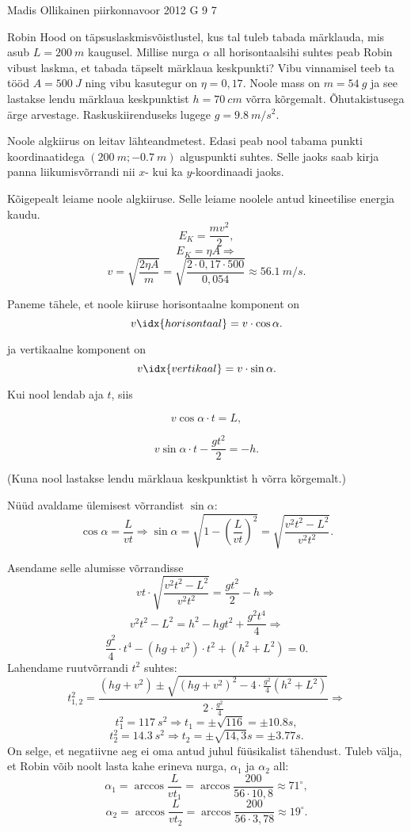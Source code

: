 {Madis Ollikainen} %
{piirkonnavoor} %
{2012} %
{G 9} %
{7} %
{
\ifStatement
Robin Hood on täpsuslaskmisvõistlustel, kus tal tuleb tabada märklauda, mis asub
$L=\SI{200}{m}$ kaugusel.  Millise nurga $\alpha$ all horisontaalsihi suhtes
peab Robin vibust laskma, et tabada täpselt märklaua keskpunkti? Vibu vinnamisel
teeb ta tööd $A=\SI{500}{J}$ ning vibu kasutegur on $\eta=0,17$. Noole mass on
$m=\SI{54}{g}$ ja see lastakse lendu märklaua keskpunktist $h=\SI{70}{cm}$ võrra
kõrgemalt.  Õhutakistusega ärge arvestage.  Raskuskiirenduseks lugege
$g=\SI{9,8}{m/s^2}$.
\fi


\ifHint
Noole algkiirus on leitav lähteandmetest. Edasi peab nool tabama punkti koordinaatidega $(\SI{200}{m};\SI{-0,7}{m})$ alguspunkti suhtes. Selle jaoks saab kirja panna liikumisvõrrandi nii $x$- kui ka $y$-koordinaadi jaoks.
\fi


\ifSolution
Kõigepealt leiame noole algkiiruse. Selle leiame noolele antud kineetilise energia kaudu.
$$ E_{K}=\frac{m v^2}{2},$$
$$E_{K}=\eta A \Rightarrow$$
$$v=\sqrt{\frac{2\eta A}{m}}=\sqrt{\frac{2\cdot0,17\cdot 500}{0,054}}\approx \SI{56,1}{m/s}.$$

Paneme tähele, et noole kiiruse horisontaalne komponent on
$$v\idx{horisontaal}=v\cdot \cos\alpha.$$

ja vertikaalne komponent on
$$v\idx{vertikaal}=v\cdot \sin\alpha.$$

Kui nool lendab aja $t$, siis 

$$v \cos\alpha\cdot t=L,$$

$$v \sin\alpha\cdot t-\frac{g t^2}{2}=-h. $$

(Kuna nool lastakse lendu märklaua keskpunktist h võrra kõrgemalt.)

Nüüd avaldame ülemisest võrrandist $\sin\alpha$:
$$\cos\alpha=\frac{L}{vt} \Rightarrow \sin\alpha=\sqrt{1-\left(\frac{L}{vt}\right)^2}=\sqrt{\frac{v^2t^2-L^2}{v^2t^2}}.$$


Asendame selle alumisse võrrandisse
$$vt\cdot \sqrt{\frac{v^2t^2-L^2}{v^2t^2}}=\frac{g t^2}{2}-h \Rightarrow$$
$$v^2t^2-L^2=h^2 - hgt^2+\frac{g^2 t^4}{4}  \Rightarrow$$
$$\frac{g^2}{4}\cdot t^4 - \left(hg+v^2\right)\cdot t^2 + \left(h^2+L^2\right)=0.$$
Lahendame ruutvõrrandi $t^2$ suhtes:
$$t^2_{1,2}=\frac{\left(hg+v^2\right)\pm\sqrt{\left(hg+v^2\right)^2-4\cdot \frac{g^2}{4}\left(h^2+L^2\right)}}{2\cdot \frac{g^2}{4}} \Rightarrow$$
$$t^2_{1}=\SI{117}{s^2}  \Rightarrow t_{1}=\pm\sqrt{116}=\pm \SI{10,8}s,$$
$$t^2_{2}=\SI{14,3}{s^2} \Rightarrow t_{2}=\pm \sqrt{14,3}\SI{}s=\pm \SI{3,77}s.$$
On selge, et negatiivne aeg ei oma antud juhul füüsikalist tähendust. Tuleb välja, et Robin võib noolt lasta kahe erineva nurga, 
$\alpha_{1}$ ja $\alpha_{2}$ all:
$$\alpha_{1}= \arccos\frac{L}{vt_{1}}=\arccos\frac{200}{56\cdot10,8}\approx 71^\circ ,$$
$$\alpha_{2}=\arccos\frac{L}{vt_{2}}=\arccos\frac{200}{56\cdot3,78}\approx 19^\circ .$$
\fi


}
